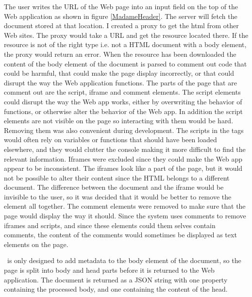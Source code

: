The user writes the URL of the Web page into an input field on the top of the Web application as shown in figure \ref{MadameHeader}.
The server will fetch the document stored at that location.
I created a proxy to get the html from other Web sites.
The proxy would take a URL and get the resource located there.
If the resource is not of the right type i.e. not a HTML document with a body element,
the proxy would return an error.
When the resource has been downloaded the content of the body element of the document is parsed to comment out code that
could be harmful, that could make the page display incorrectly, or that could disrupt the way the Web application functions.
The parts of the page that are comment out are the script, iframe and comment elements.
The script elements could disrupt the way the Web app works, either by overwriting the behavior of functions,
or otherwise alter the behavior of the Web app.
In addition the script elements are not visible on the page so interacting with them would be hard.
Removing them was also convenient during development.
The scripts in the tags would often rely on variables or functions that should have been loaded elsewhere,
and they would clutter the console making it more difficult to find the relevant information.
Iframes were excluded since they could make the Web app appear to be inconsistent.
The iframes look like a part of the page,
but it would not be possible to alter their content since the HTML belongs to a different document.
The difference between the document and the iframe would be invisible to the user,
so it was decided that it would be better to remove the element all together.
The comment elements were removed to make sure that the page would display the way it should.
Since the system uses comments to remove iframes and scripts, and since these elements could them selves contain comments,
the content of the comments would sometimes be displayed as text elements on the page.

\Theartefact\ is only designed to add metadata to the body element of the document,
so the page is split into body and head parts before it is returned to the Web application.
The document is returned as a JSON string with one property containing the processed body,
and one containing the content of the head.


